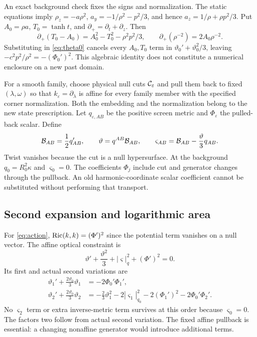 \documentclass[11pt]{article}
\newcommand{\eps}{\varepsilon}
\begin{document}
An exact background check fixes the signs and normalization.
The static equations imply
$\rho_z=-a\rho^2$, $a_y=-1/\rho^2-p^2/3$, and hence
$a_z=1/\rho+\rho p^2/3$. Put $A_0=\rho a$, $T_0=\tanh t$,
and $\partial_+=\partial_t+\partial_z$. Then
\[
 \partial_+(T_0-A_0)=A_0^2-T_0^2-\rho^2p^2/3,\qquad
 \partial_+(\rho^{-2})=2A_0\rho^{-2}.
\]
Substituting in \eqref{eq:theta0} cancels every $A_0,T_0$ term in
$\vartheta_0'+\vartheta_0^2/3$, leaving
$-c^2p^2/\rho^2=-(\Phi_0')^2$. This algebraic identity does not
constitute a numerical enclosure on a new past domain.

For a smooth family, choose physical null cuts $ {\cal C}_\eps$ and pull
them back to fixed $(\lambda,\omega)$ so that
$k_\eps=\partial_\lambda$ is affine for every family member with the
specified corner normalization. Both the embedding and the normalization
belong to the new state prescription. Let $q_{\eps,AB}$ be the positive
screen metric and $\Phi_\eps$ the pulled-back scalar. Define
\begin{equation}
 {\cal B}_{AB}=\frac12q_{AB}',\qquad
 \vartheta=q^{AB}{\cal B}_{AB},\qquad
 \varsigma_{AB}={\cal B}_{AB}-\frac{\vartheta}{3}q_{AB}.
\end{equation}
Twist vanishes because the cut is a null hypersurface.
At the background $q_0=R_0^2\kappa$ and $\varsigma_0=0$.
The coefficients $\Phi_j$ include cut and generator changes through the
pullback. An old harmonic-coordinate scalar coefficient cannot be
substituted without performing that transport.

\subsection{Second expansion and logarithmic area}
For \eqref{eq:action}, $ {\rm Ric}(k,k)=(\Phi')^2$ since the potential term
vanishes on a null vector. The affine optical constraint is
\begin{equation}
 \vartheta'+\frac{\vartheta^2}{3}
          +|\varsigma|_q^2+(\Phi')^2=0.
 \label{eq:raych}
\end{equation}
Its first and actual second variations are
\begin{align}
 \vartheta_1'+\frac{2\vartheta_0}{3}\vartheta_1
       &=-2\Phi_0'\Phi_1',\label{eq:raych1}\\
 \vartheta_2'+\frac{2\vartheta_0}{3}\vartheta_2
       &=-\frac23\vartheta_1^2-2|\varsigma_1|_{q_0}^2
                  -2(\Phi_1')^2-2\Phi_0'\Phi_2'.
 \label{eq:raych2}
\end{align}
No $\varsigma_2$ term or extra inverse-metric term survives at this order
because $\varsigma_0=0$. The factors two follow from actual second
variation. The fixed affine pullback is essential: a changing nonaffine
generator would introduce additional terms.
\end{document}
